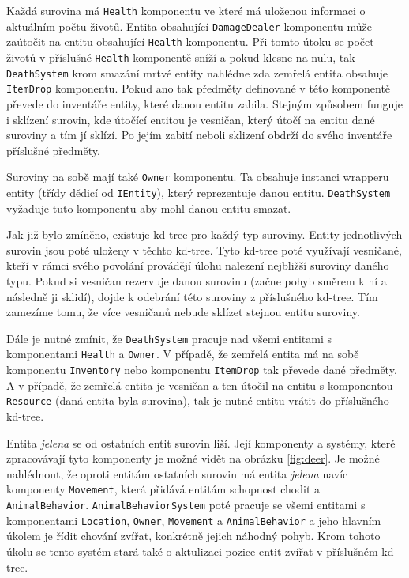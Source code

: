 Každá surovina má \texttt{Health} komponentu ve které má uloženou informaci o aktuálním počtu životů. Entita obsahující \texttt{DamageDealer} komponentu může zaútočit na entitu obsahující \texttt{Health} komponentu. Při tomto útoku se počet životů v příslušné \texttt{Health} komponentě sníží a pokud klesne na nulu, tak \texttt{DeathSystem} krom smazání mrtvé entity nahlédne zda zemřelá entita obsahuje \texttt{ItemDrop} komponentu. Pokud ano tak předměty definované v této komponentě převede do inventáře entity, které danou entitu zabila. Stejným způsobem funguje i sklízení surovin, kde útočící entitou je vesničan, který útočí na entitu dané suroviny a tím jí sklízí. Po jejím zabití neboli sklizení obdrží do svého inventáře příslušné předměty.

Suroviny na sobě mají také \texttt{Owner} komponentu. Ta obsahuje instanci wrapperu entity (třídy dědicí od \texttt{IEntity}), který reprezentuje danou entitu. \texttt{DeathSystem} vyžaduje tuto komponentu aby mohl danou entitu smazat.

Jak již bylo zmíněno, existuje kd-tree pro každý typ suroviny. Entity jednotlivých surovin jsou poté uloženy v těchto kd-tree. Tyto kd-tree poté využívají vesničané, kteří v rámci svého povolání provádějí úlohu nalezení nejbližší suroviny daného typu. Pokud si vesničan rezervuje danou surovinu (začne pohyb směrem k ní a následně ji sklidí), dojde k odebrání této suroviny z příslušného kd-tree. Tím zamezíme tomu, že více vesničanů nebude sklízet stejnou entitu suroviny.

Dále je nutné zmínit, že \texttt{DeathSystem} pracuje nad všemi entitami s komponentami \texttt{Health} a \texttt{Owner}. V případě, že zemřelá entita má na sobě komponentu \texttt{Inventory} nebo komponentu \texttt{ItemDrop} tak převede dané předměty. A v případě, že zemřelá entita je vesničan a ten útočil na entitu s komponentou \texttt{Resource} (daná entita byla surovina), tak je nutné entitu vrátit do příslušného kd-tree.

Entita \textit{jelena} se od ostatních entit surovin liší. Její komponenty a systémy, které zpracovávají tyto komponenty je možné vidět na obrázku \ref{fig:deer}. Je možné nahlédnout, že oproti entitám ostatních surovin má entita \textit{jelena} navíc komponenty \texttt{Movement}, která přidává entitám schopnost chodit a \texttt{AnimalBehavior}. \texttt{AnimalBehaviorSystem} poté pracuje se všemi entitami s komponentami \texttt{Location}, \texttt{Owner}, \texttt{Movement} a \texttt{AnimalBehavior} a jeho hlavním úkolem je řídit chování zvířat, konkrétně jejich náhodný pohyb. Krom tohoto úkolu se tento systém stará také o aktulizaci pozice entit zvířat v příslušném kd-tree.

